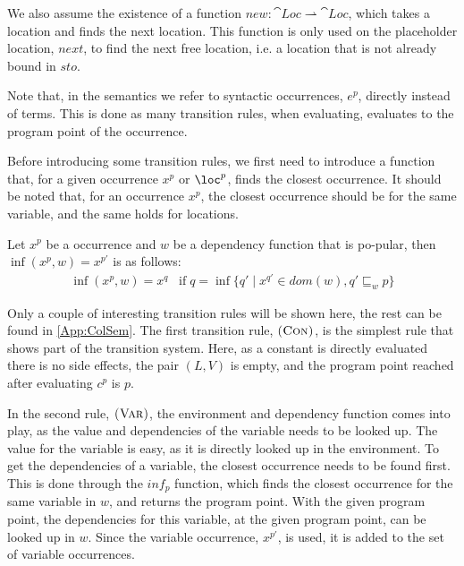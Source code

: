 \documentclass[../../master.tex]{subfiles}
\begin{document}
We also assume the existence of a function $new:\cat{Loc}\rightharpoonup\cat{Loc}$, which takes a location and finds the next location.
This function is only used on the placeholder location, $next$, to find the next free location, i.e. a location that is not already bound in $sto$.

Note that, in the semantics we refer to syntactic occurrences, $e^p$, directly instead of terms.
This is done as many transition rules, when evaluating, evaluates to the program point of the occurrence.
\bigskip

Before introducing some transition rules, we first need to introduce a function that, for a given occurrence $x^p$ or $\loc^p$, finds the closest occurrence.
It should be noted that, for an occurrence $x^p$, the closest occurrence should be for the same variable, and the same holds for locations.

\begin{definition}
	Let $x^p$ be a occurrence and $w$ be a dependency function that is po-pular, then $\inf(x^p,w)=x^{p'}$ is as follows:
	\begin{align*}
		\inf(x^p,w)=x^q \;\;\; \mbox{if} \; q=\inf\{q'\mid x^{q'}\in dom(w), q'\sqsubseteq_w p\}
	\end{align*}
\end{definition}
\bigskip

Only a couple of interesting transition rules will be shown here, the rest can be found in \cref{App:ColSem}.
The first transition rule, $\textsc{(Con)}$, is the simplest rule that shows part of the transition system.
Here, as a constant is directly evaluated there is no side effects, the pair $(L,V)$ is empty, and the program point reached after evaluating $c^p$ is $p$.

In the second rule, $\textsc{(Var)}$, the environment and dependency function comes into play, as the value and dependencies of the variable needs to be looked up.
The value for the variable is easy, as it is directly looked up in the environment.
To get the dependencies of a variable, the closest occurrence needs to be found first.
This is done through the $inf_p$ function, which finds the closest occurrence for the same variable in $w$, and returns the program point.
With the given program point, the dependencies for this variable, at the given program point, can be looked up in $w$.
Since the variable occurrence, $x^{p'}$, is used, it is added to the set of variable occurrences.
\end{document}
